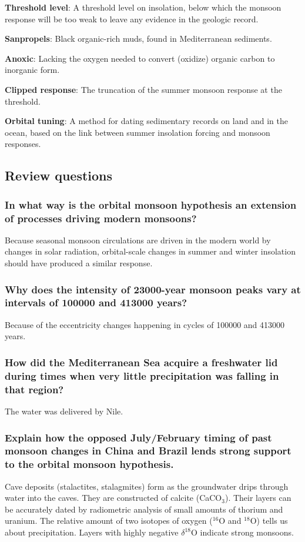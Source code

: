 \textbf{Threshold level}: A threshold level on insolation, below which the
monsoon response will be too weak to leave any evidence in the geologic record.

\textbf{Sanpropels}: Black organic-rich muds, found in Mediterranean sediments.

\textbf{Anoxic}: Lacking the oxygen needed to convert (oxidize) organic carbon
to inorganic form.

\textbf{Clipped response}: The truncation of the summer monsoon response at the
threshold.

\textbf{Orbital tuning}: A method for dating sedimentary records on land and in
the ocean, based on the link between summer insolation forcing and monsoon
responses.

\subsection{Review questions}

\subsubsection{In what way is the orbital monsoon hypothesis an extension of
processes driving modern monsoons?}

Because seasonal monsoon circulations are driven in the modern world by changes
in solar radiation, orbital-scale changes in summer and winter insolation
should have produced a similar response.

\subsubsection{Why does the intensity of 23000-year monsoon peaks vary at
intervals of 100000 and 413000 years?}
Because of the eccentricity changes happening in cycles of 100000 and 413000
years.

\subsubsection{How did the Mediterranean Sea acquire a freshwater lid during
times when very little precipitation was falling in that region?}
The water was delivered by Nile.

\subsubsection{Explain how the opposed July/February timing of past monsoon
changes in China and Brazil lends strong support to the orbital monsoon
hypothesis.}
Cave deposits (stalactites, stalagmites) form as the groundwater drips through
water into the caves. They are constructed of calcite (CaCO$_3$). Their layers
can be accurately dated by radiometric analysis of small amounts of thorium
and uranium. The relative amount of two isotopes of oxygen ($^{16}$O and
$^{18}$O) tells us about precipitation. Layers with highly negative
$\delta^{18}$O indicate strong monsoons.


